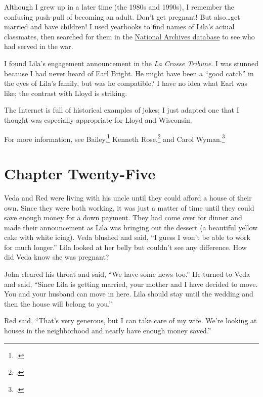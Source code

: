 \documentclass[
  american,
  letterpaper,
]{book}
\begin{document}
Although I grew up in a later time (the 1980s and 1990s), I remember the
confusing push-pull of becoming an adult. Don't get pregnant! But
also\ldots get married and have children! I used yearbooks to find names
of Lila's actual classmates, then searched for them in the
\href{https://aad.archives.gov/aad/index.jsp}{National Archives
database} to see who had served in the war.

I found Lila's engagement announcement in the \emph{La Crosse Tribune}.
I was stunned because I had never heard of Earl Bright. He might have
been a ``good catch'' in the eyes of Lila's family, but was he
compatible? I have no idea what Earl was like; the contrast with Lloyd
is striking.

The Internet is full of historical examples of jokes; I just adapted one
that I thought was especially appropriate for Lloyd and Wisconsin.

For more information, see Bailey,\footnote{.} Kenneth Rose,\footnote{.} and Carol Wyman.\footnote{.}


\chapter{Chapter Twenty-Five}\label{chapter-twenty-five}

Veda and Red were living with his uncle until they could afford a house
of their own. Since they were both working, it was just a matter of time
until they could save enough money for a down payment. They had come
over for dinner and made their announcement as Lila was bringing out the
dessert (a beautiful yellow cake with white icing). Veda blushed and
said, ``I guess I won't be able to work for much longer.'' Lila looked
at her belly but couldn't see any difference. How did Veda know she was
pregnant?

John cleared his throat and said, ``We have some news too.'' He turned
to Veda and said, ``Since Lila is getting married, your mother and I
have decided to move. You and your husband can move in here. Lila should
stay until the wedding and then the house will belong to you.''

Red said, ``That's very generous, but I can take care of my wife. We're
looking at houses in the neighborhood and nearly have enough money
saved.''
\end{document}
